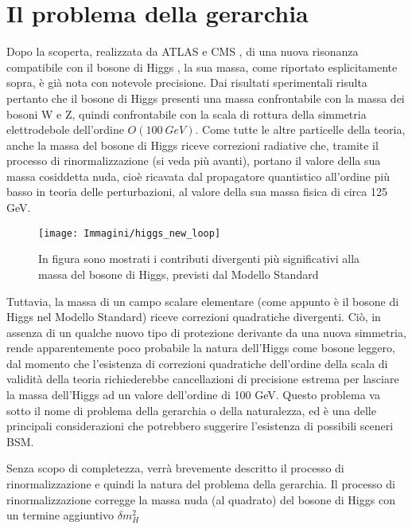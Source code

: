 \section{Il problema della gerarchia}
Dopo la scoperta, realizzata da ATLAS \cite{atlasHiggs} e CMS \cite{cmsHiggs}, di una nuova risonanza compatibile con il bosone di Higgs , 
la sua massa, come riportato esplicitamente sopra, è già nota con notevole precisione.
Dai risultati sperimentali risulta pertanto che il bosone di Higgs presenti una massa confrontabile con la massa dei bosoni W e Z, quindi confrontabile con la scala di rottura della simmetria 
elettrodebole dell'ordine $O(100 ~GeV)$.
\newline
Come tutte le altre particelle della teoria, anche la massa del bosone di Higgs riceve correzioni radiative che, tramite il 
processo di rinormalizzazione (si veda più avanti), portano il valore della sua massa cosiddetta nuda, cioè ricavata dal propagatore quantistico all'ordine più
basso in teoria delle perturbazioni, al valore della sua massa fisica di circa 125 GeV.

\begin{figure}[!htbp]
\begin{center}
\texttt{[image: Immagini/higgs\_new\_loop]}
\end{center}
\caption{In figura sono mostrati i contributi divergenti più significativi alla massa del bosone di Higgs, previsti dal Modello Standard }
\label{higgs_loop}
\end{figure}

Tuttavia, la massa di un campo scalare elementare (come appunto è il bosone di Higgs nel Modello Standard) riceve correzioni quadratiche
divergenti. Ciò, in assenza di un qualche nuovo tipo di protezione derivante da una nuova simmetria, rende apparentemente poco probabile
la natura dell'Higgs come bosone leggero, dal momento che l'esistenza di correzioni quadratiche dell'ordine della scala di validità della teoria
richiederebbe cancellazioni di precisione estrema per lasciare la massa dell'Higgs ad un valore dell'ordine di 100 GeV.
\newline
Questo problema va sotto il nome di problema della gerarchia o della naturalezza, ed è una delle principali considerazioni 
che potrebbero suggerire l'esistenza di possibili sceneri \acs{BSM}.

\medskip
Senza scopo di completezza, verrà brevemente descritto il processo di rinormalizzazione e quindi la natura del problema della gerarchia.
\newline
Il processo di rinormalizzazione corregge la massa nuda (al quadrato) del bosone di Higgs con un termine aggiuntivo $\delta m^{2}_{H}$

